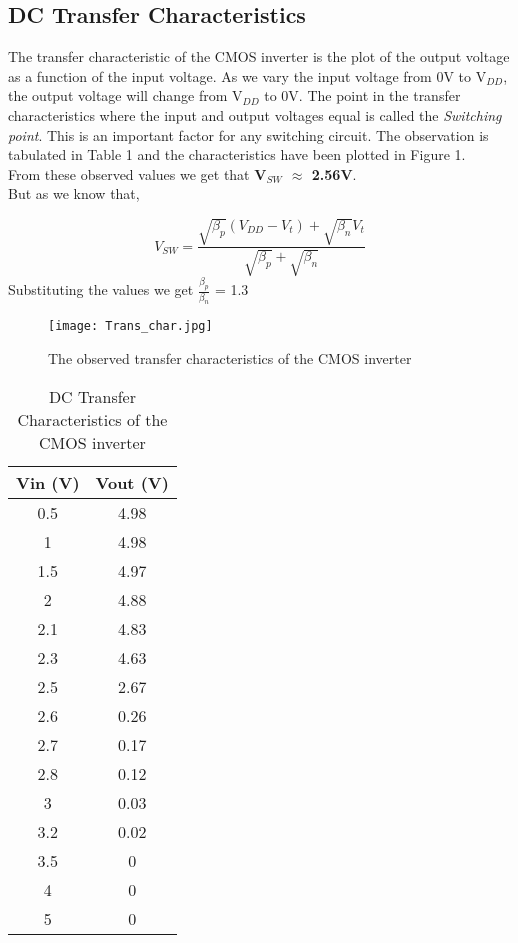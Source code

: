 \documentclass[12pt]{article}
\begin{document}

\subsection{DC Transfer Characteristics}
The transfer characteristic of the CMOS inverter is the plot of the output voltage as a function of the input voltage. As we vary the input voltage from 0V to V$_{DD}$, the output voltage will change from V$_{DD}$ to 0V.
The point in the transfer characteristics where the input and output voltages equal is called the \textit{Switching point}. This is an important factor for any switching circuit. The observation is tabulated in Table 1 and the characteristics have been plotted in Figure 1.\\From these observed values we get that \textbf{V$_{SW}$  $\approx$ 2.56V}.\\
But as we know that,


\begin{equation}
 V_{SW} = \frac{\sqrt{\beta_p}(V_{DD} -V_t) +\sqrt{\beta_n}V_t }{\sqrt{\beta_p}+\sqrt{\beta_n}}  
\end{equation}
\linebreak
Substituting the values we get \(\frac{\beta_p}{\beta_n}\) = 1.3

\begin{figure}
\texttt{[image: Trans\_char.jpg]}
\centering
\caption{The observed transfer characteristics of the CMOS inverter}
\end{figure}

\begin{table}[H]
\centering
\begin{tabular}{| c | c |} 
\hline
\textbf { Vin (V)} &\textbf{ Vout (V)} \\ 
\hline
0.5 & 4.98  \\
1 & 4.98  \\
1.5 & 4.97  \\
2 & 4.88  \\
2.1 & 4.83  \\
2.3 & 4.63  \\
2.5 & 2.67  \\
2.6 & 0.26  \\
2.7 & 0.17  \\
2.8 & 0.12  \\
3 & 0.03  \\
3.2 & 0.02  \\
3.5 & 0 \\
4 & 0 \\
5 & 0 \\
 \hline
\end{tabular}
\caption{DC Transfer Characteristics of the CMOS inverter}

\end{table}
\end{document}
